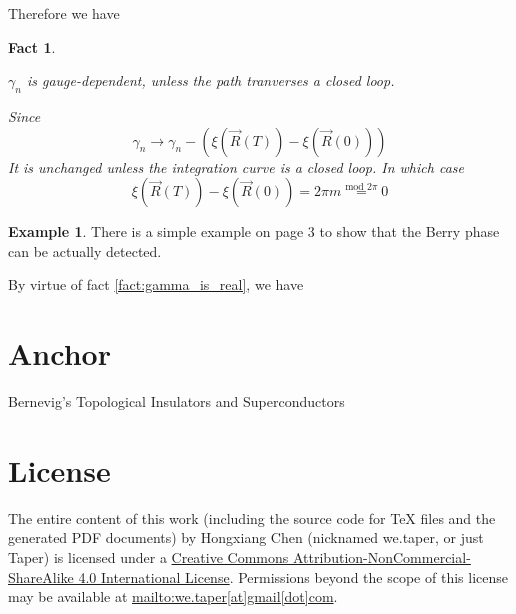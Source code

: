 \documentclass{article}
\numberwithin{equation}{subsection} %
\newtheorem{fact}{Fact}[section]
\theoremstyle{definition}
\newtheorem{ex}{Example}[section]
\begin{document}
Therefore we have
\begin{fact}
    $  $
    \begin{center}
        $\gamma_n$ is gauge-dependent, unless the path tranverses a
        closed loop.
    \end{center}
    Since 
    $$ \gamma_n \to \gamma_n - \left(\xi(\vec{R}(T))-
    \xi(\vec{R}(0)) \right) $$
    It is unchanged unless the integration curve is a closed loop. In
    which case
    $$\xi(\vec{R}(T)) - \xi(\vec{R}(0)) = 2\pi m
    \overset{\text{mod }2\pi}{=} 0 $$
\end{fact}
\begin{ex}
    There is a simple example on page 3 to show that the Berry phase
    can be actually detected.
\end{ex}
By virtue of fact \ref{fact:gamma_is_real}, we have
\section{Anchor}
\label{sec:Anchor}

\begin{thebibliography}{1}
     Bernevig's Topological Insulators and
    Superconductors
\end{thebibliography}
\printnomenclature
\section{License}
The entire content of this work (including the source code
for TeX files and the generated PDF documents) by 
Hongxiang Chen (nicknamed we.taper, or just Taper) is
licensed under a 
\href{http://creativecommons.org/licenses/by-nc-sa/4.0/}{Creative 
Commons Attribution-NonCommercial-ShareAlike 4.0 International 
License}. Permissions beyond the scope of this 
license may be available at \url{mailto:we.taper[at]gmail[dot]com}.
\end{document}
